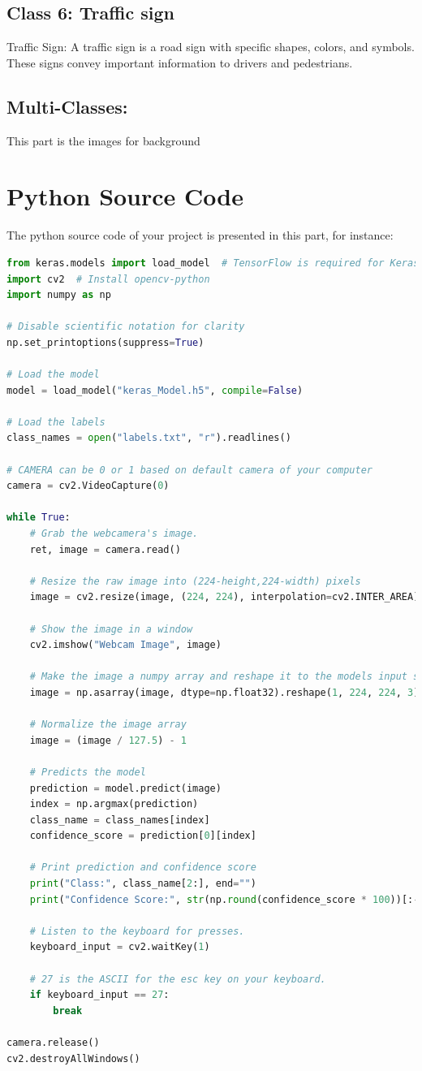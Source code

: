 \documentclass[a4paper,11pt]{article}
\theoremstyle{mytheor}
\begin{document}
\subsection{Class 6: Traffic sign}
Traffic Sign: A traffic sign is a road sign with specific shapes, colors, and symbols. These signs convey important information to drivers and pedestrians.  

\subsection{Multi-Classes:}
This part is the images for background

\section{Python Source Code}

The python source code of your project is presented in this part, for instance:

\begin{lstlisting}[language=Python, caption= Example of your Python code, label=test_float]
from keras.models import load_model  # TensorFlow is required for Keras to work
import cv2  # Install opencv-python
import numpy as np

# Disable scientific notation for clarity
np.set_printoptions(suppress=True)

# Load the model
model = load_model("keras_Model.h5", compile=False)

# Load the labels
class_names = open("labels.txt", "r").readlines()

# CAMERA can be 0 or 1 based on default camera of your computer
camera = cv2.VideoCapture(0)

while True:
    # Grab the webcamera's image.
    ret, image = camera.read()

    # Resize the raw image into (224-height,224-width) pixels
    image = cv2.resize(image, (224, 224), interpolation=cv2.INTER_AREA)

    # Show the image in a window
    cv2.imshow("Webcam Image", image)

    # Make the image a numpy array and reshape it to the models input shape.
    image = np.asarray(image, dtype=np.float32).reshape(1, 224, 224, 3)

    # Normalize the image array
    image = (image / 127.5) - 1

    # Predicts the model
    prediction = model.predict(image)
    index = np.argmax(prediction)
    class_name = class_names[index]
    confidence_score = prediction[0][index]

    # Print prediction and confidence score
    print("Class:", class_name[2:], end="")
    print("Confidence Score:", str(np.round(confidence_score * 100))[:-2], "%")

    # Listen to the keyboard for presses.
    keyboard_input = cv2.waitKey(1)

    # 27 is the ASCII for the esc key on your keyboard.
    if keyboard_input == 27:
        break

camera.release()
cv2.destroyAllWindows()

\end{lstlisting}
\end{document}
